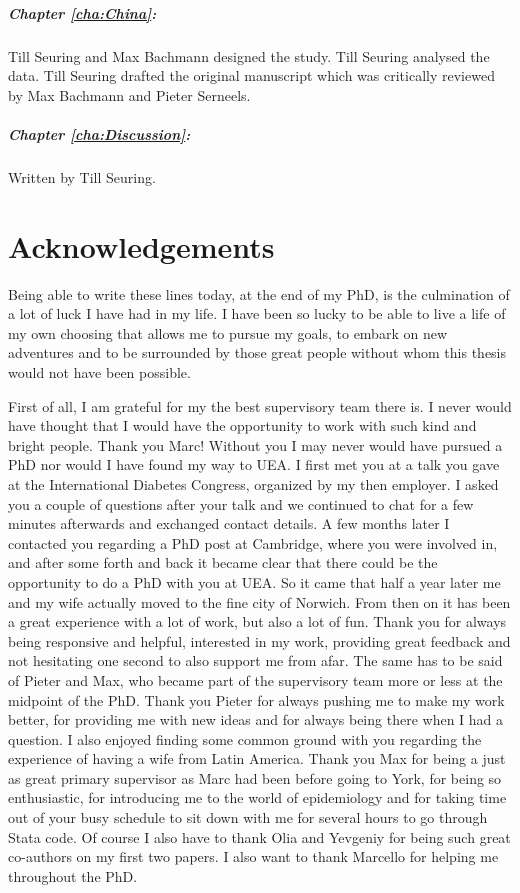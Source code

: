\paragraph{Chapter \ref{cha:China}:} Till Seuring and Max Bachmann designed the study. Till Seuring analysed the data. Till Seuring drafted the original manuscript which was critically reviewed by Max Bachmann and Pieter Serneels.

\paragraph{Chapter \ref{cha:Discussion}:} Written by Till Seuring.
\cleardoublepage

\chapter*{\label{acknowledgements}Acknowledgements}

Being able to write these lines today, at the end of my PhD, is the culmination of a lot of luck I have had in my life. I have been so lucky to be able to live a life of my own choosing that allows me to pursue my goals, to embark on new adventures and to be surrounded by those great people without whom this thesis would not have been possible. 

First of all, I am grateful for my the best supervisory team there is. I never would have thought that I would have the opportunity to work with such kind and bright people. Thank you Marc! Without you I may never would have pursued a PhD nor would I have found my way to UEA. I first met you at a talk you gave at the International Diabetes Congress, organized by my then employer. I asked you a couple of questions after your talk and we continued to chat for a few minutes afterwards and exchanged contact details. A few months later I contacted you regarding a PhD post at Cambridge, where you were involved in, and after some forth and back it became clear that there could be the opportunity to do a PhD with you at UEA. So it came that half a year later me and my wife actually moved to the fine city of Norwich. From then on it has been a great experience with a lot of work, but also a lot of fun. Thank you for always being responsive and helpful, interested in my work, providing great feedback and not hesitating one second to also support me from afar. The same has to be said of Pieter and Max, who became part of the supervisory team more or less at the midpoint of the PhD. Thank you Pieter for always pushing me to make my work better, for providing me with new ideas and for always being there when I had a question. I also enjoyed finding some common ground with you regarding the experience of having a wife from Latin America. Thank you Max for being a just as great primary supervisor as Marc had been before going to York, for being so enthusiastic, for introducing me to the world of epidemiology and for taking time out of your busy schedule to sit down with me for several hours to go through Stata code. Of course I also have to thank Olia and Yevgeniy for being such great co-authors on my first two papers. I also want to thank Marcello for helping me throughout the PhD.

